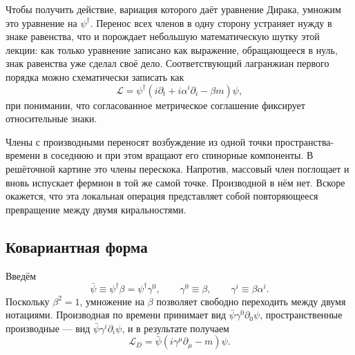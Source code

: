 Чтобы получить действие, вариация которого даёт уравнение Дирака, умножим это уравнение на \(\psi^\dagger\). Перенос всех членов в одну сторону устраняет нужду в знаке равенства, что и порождает небольшую математическую шутку этой лекции: как только уравнение записано как выражение, обращающееся в нуль, знак равенства уже сделал своё дело. Соответствующий лагранжиан первого порядка можно схематически записать как
\begin{equation}
  \mathcal L
  =
  \psi^\dagger
  \left(i\partial_t+i\alpha^i\partial_i-\beta m\right)\psi ,
  \label{eq:l10-dirac-old-lagrangian}
\end{equation}
при понимании, что согласованное метрическое соглашение фиксирует относительные знаки.

Члены с производными переносят возбуждение из одной точки пространства-времени в соседнюю и при этом вращают его спинорные компоненты. В решёточной картине это члены перескока. Напротив, массовый член поглощает и вновь испускает фермион в той же самой точке. Производной в нём нет. Вскоре окажется, что эта локальная операция представляет собой повторяющееся превращение между двумя киральностями.

\begin{classroomqa}
\end{classroomqa}

\subsection{Ковариантная форма}

Введём
\begin{equation}
  \bar\psi\equiv\psi^\dagger\beta
  =\psi^\dagger\gamma^0,
  \qquad
  \gamma^0\equiv\beta,
  \qquad
  \gamma^i\equiv\beta\alpha^i .
  \label{eq:l10-dirac-adjoint}
\end{equation}
Поскольку \(\beta^2=1\), умножение на \(\beta\) позволяет свободно переходить между двумя нотациями. Производная по времени принимает вид \(\bar\psi\gamma^0\partial_0\psi\), пространственные производные — вид \(\bar\psi\gamma^i\partial_i\psi\), и в результате получаем
\begin{equation}
  \boxed{\mathcal L_D
  =\bar\psi\left(i\gamma^\mu\partial_\mu-m\right)\psi .}
  \label{eq:l10-covariant-dirac}
\end{equation}

